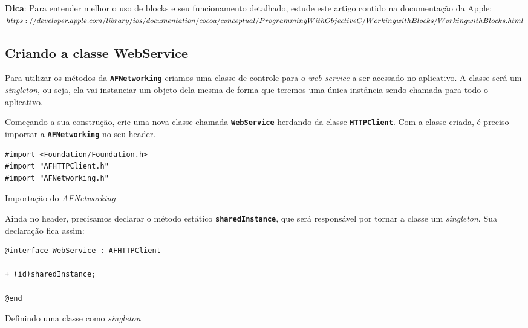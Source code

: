 \documentclass[a4paper,12pt,brazil,doubleside]{book}
\begin{document}
\begin{singlespace}
\begin{framed}

\textbf{Dica}:  Para entender melhor o uso de blocks e seu funcionamento detalhado, estude este artigo contido na documentação da Apple:\\
\(https://developer.apple.com/library/ios/documentation/cocoa/conceptual/\\ProgrammingWithObjectiveC/WorkingwithBlocks/WorkingwithBlocks.html\)
\end{framed}

\subsection{Criando a classe WebService}


Para utilizar os métodos da \texttt{\textbf{AFNetworking}} criamos uma classe de controle para o \emph{web service} a ser acessado no aplicativo. A classe será um \emph{singleton}, ou seja, ela vai instanciar um objeto dela mesma de forma que teremos uma única instância sendo chamada para todo o aplicativo.

Começando a sua construção, crie uma nova classe chamada \texttt{\textbf{WebService}} herdando da classe \texttt{\textbf{HTTPClient}}. Com a classe criada, é preciso importar a \texttt{\textbf{AFNetworking}} no seu header.

\begin{listing}[H]
\begin{verbatim}
#import <Foundation/Foundation.h>
#import "AFHTTPClient.h"
#import "AFNetworking.h"
\end{verbatim}
\caption{Importação do \emph{AFNetworking}}
\end{listing}


Ainda no header, precisamos declarar o método estático \texttt{\textbf{sharedInstance}}, que será responsável por tornar a classe um \emph{singleton}. Sua declaração fica assim:

\begin{listing}[H]
\begin{verbatim}
@interface WebService : AFHTTPClient

+ (id)sharedInstance;

@end
\end{verbatim}
\caption{Definindo uma classe como \emph{singleton}}
\end{listing}



\end{singlespace}
\end{document}
